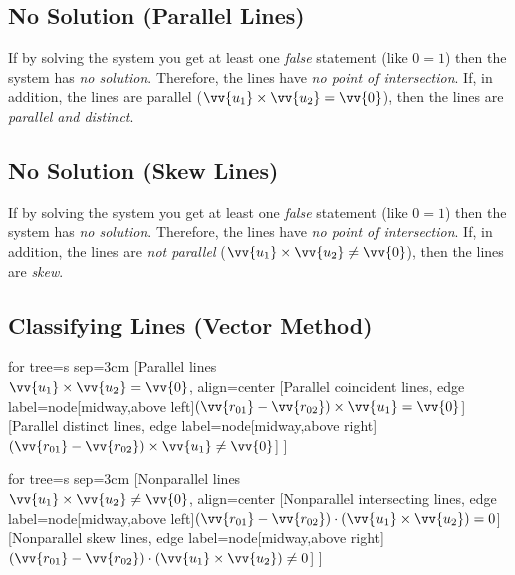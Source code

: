 \subsection{No Solution (Parallel Lines)}
	If by solving the system you get at least one \emph{false} statement (like $0=1$) then the system has \emph{no solution}.
	Therefore, the lines have \emph{no point of intersection}.
	If, in addition, the lines are parallel ($\vv{u_1} \times \vv{u_2} = \vv{0}$), then the lines are \emph{parallel and distinct}.
\subsection{No Solution (Skew Lines)}
	If by solving the system you get at least one \emph{false} statement (like $0=1$) then the system has \emph{no solution}.
	Therefore, the lines have \emph{no point of intersection}.
	If, in addition, the lines are \emph{not parallel} ($\vv{u_1} \times \vv{u_2} \neq \vv{0}$), then the lines are \emph{skew}.
\subsection{Classifying Lines (Vector Method)}
	\begin{center}
		\begin{forest}
			for tree={s sep=3cm}
			[{Parallel lines\\$\vv{u_1} \times \vv{u_2} = \vv{0}$}, align=center
				[Parallel coincident lines, edge label={node[midway,above left]{$(\vv{r_{01}}-\vv{r_{02}}) \times \vv{u_1} = \vv{0}$}}]
				[Parallel distinct lines, edge label={node[midway,above right]{$(\vv{r_{01}}-\vv{r_{02}}) \times \vv{u_1} \neq \vv{0}$}}]
			]
		\end{forest}

		\vspace{1cm}

		\begin{forest}
			for tree={s sep=3cm}
			[Nonparallel lines\\$\vv{u_1} \times \vv{u_2} \neq \vv{0}$, align=center
				[Nonparallel intersecting lines, edge label={node[midway,above left]{$(\vv{r_{01}}-\vv{r_{02}})\cdot(\vv{u_1}\times\vv{u_2}) = 0$}}]
				[Nonparallel skew lines, edge label={node[midway,above right]{$(\vv{r_{01}}-\vv{r_{02}})\cdot(\vv{u_1}\times\vv{u_2}) \neq 0$}}]
			]
		\end{forest}
	\end{center}

